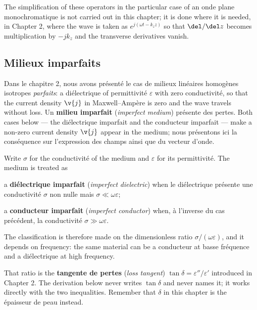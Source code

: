 \begin{remark}
  The simplification of these operators in the particular case of an onde
  plane monochromatique is not carried out in this chapter; it is done where
  it is needed, in Chapter 2, where the wave is taken as
  $e^{j(\omega t - k_z z)}$ so that $\del/\del z$ becomes multiplication by
  $-jk_z$ and the transverse derivatives vanish.
\end{remark}

\subsection{Milieux imparfaits}

Dans le chapitre 2, nous avons présenté le cas de milieux linéaires homogènes
isotropes \emph{parfaits}: a diélectrique of permittivité $\varepsilon$ with
zero conductivité, so that the current density $\v{j}$ in Maxwell--Ampère is
zero and the wave travels without loss. Un \textbf{milieu imparfait}
(\textit{imperfect medium}) présente des pertes. Both cases below --- the
diélectrique imparfait and the conducteur imparfait --- make a non-zero current
density $\v{j}$ appear in the medium; nous présentons ici la conséquence sur
l'expression des champs ainsi que du vecteur d'onde.

\begin{definition}
  Write $\sigma$ for the conductivité of the medium and $\varepsilon$ for its
  permittivité. The medium is treated as
  \begin{subpart}
    \item a \textbf{diélectrique imparfait} (\textit{imperfect dielectric})
      when le diélectrique présente une conductivité $\sigma$ non nulle mais
      $\sigma \ll \omega\varepsilon$;
    \item a \textbf{conducteur imparfait} (\textit{imperfect conductor})
      when, à l'inverse du cas précédent, la conductivité
      $\sigma \gg \omega\varepsilon$.
  \end{subpart}
  The classification is therefore made on the dimensionless ratio
  $\sigma/(\omega\varepsilon)$, and it depends on frequency: the same material
  can be a conducteur at basse fréquence and a diélectrique at high frequency.
\end{definition}

\begin{remark}
  That ratio is the \textbf{tangente de pertes} (\textit{loss tangent})
  $\tan\delta = \varepsilon''/\varepsilon'$ introduced in Chapter 2. The
  derivation below never writes $\tan\delta$ and never names it; it works
  directly with the two inequalities. Remember that $\delta$ in this chapter is
  the épaisseur de peau instead.
\end{remark}

